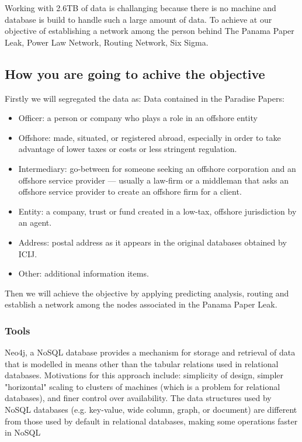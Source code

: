Working with 2.6TB of data is challanging because there is no machine and database is build to handle such a large amount of data. To achieve at our objective of establishing a network among the person behind The Panama Paper Leak, Power Law Network, Routing Network, Six Sigma.

\subsection{How you are going to achive the objective}
Firstly we will segregated the data as: Data contained in the Paradise Papers:
\begin{itemize}
\item Officer: a person or company who plays a role in an offshore entity
\item Offshore: made, situated, or registered abroad, especially in order to take advantage of lower taxes or costs or less stringent regulation.
\item Intermediary: go-between for someone seeking an offshore corporation and an offshore service provider — usually a law-firm or a middleman that asks an offshore service provider to create an offshore firm for a client. 
\item	Entity: a company, trust or fund created in a low-tax, offshore jurisdiction by an agent. 
\item	Address: postal address as it appears in the original databases obtained by ICIJ. 
\item	Other: additional information items.
\end{itemize}
Then we will achieve the objective by applying predicting analysis, routing and establish a network among the nodes associated in the Panama Paper Leak.

\subsubsection{Tools}
Neo4j, a NoSQL database provides a mechanism for storage and retrieval of data that is modelled in means other than the tabular relations used in relational databases. Motivations for this approach include: simplicity of design, simpler "horizontal" scaling to clusters of machines (which is a problem for relational databases), and finer control over availability. The data structures used by NoSQL databases (e.g. key-value, wide column, graph, or document) are different from those used by default in relational databases, making some operations faster in NoSQL

